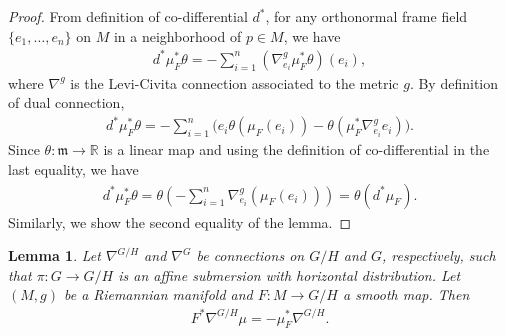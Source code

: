 \documentclass[pdftex]{sigma}
\numberwithin{equation}{section}
\newtheorem{Lemma}[Theorem]{Lemma}
\begin{document}
\begin{proof}
  From def\/inition of co-dif\/ferential $d^{*}$, for any orthonormal frame f\/ield $\{e_{1},\ldots, e_{n}\}$ on $M$ in a neighborhood of $p \in M$, we have
  \begin{gather*}
    d^{*}\mu_{F}^*\theta = -\sum_{i=1}^{n} (\nabla^{g}_{e_{i}}\mu_{F}^{*}\theta)(e_{i}),
  \end{gather*}
  where $\nabla^{g}$ is the Levi-Civita connection associated to the metric $g$. By def\/inition of dual connection,
  \begin{gather*}
    d^{*}\mu_{F}^{*}\theta
 =  -\sum_{i=1}^{n}\big(e_{i}\theta(\mu_{F}(e_{i})) - \theta(\mu_{F}^{*}\nabla^{g}_{e_{i}}e_{i})\big).
  \end{gather*}
  Since $\theta\colon \mathfrak{m} \rightarrow \mathbb{R}$ is a linear map and using the def\/inition of co-dif\/ferential in the last equality, we
  have
  \begin{gather*}
    d^{*}\mu_{F}^{*}\theta = \theta\left(-\sum_{i=1}^{n}\nabla^{g}_{e_{i}}(\mu_{F}(e_{i}))\right) =
    \theta(d^{*}\mu_{F}).
  \end{gather*}
  Similarly, we  show the second equality of the lemma.
\end{proof}


\begin{Lemma}\label{changeofmu}
  Let $\nabla^{G/H}$ and $\nabla^{G}$ be connections on $G/H$ and $G$, respectively, such that $\pi \colon G \rightarrow G/H$ is an affine submersion with horizontal distribution. Let~$(M,g)$ be a Riemannian manifold and $F\colon M \rightarrow G/H$ a smooth map. Then
  \begin{gather*}%
    F^*\nabla^{G/H}\mu=  - \mu_{F}^*\nabla^{G/H}.
  \end{gather*}
\end{Lemma}
\end{document}
